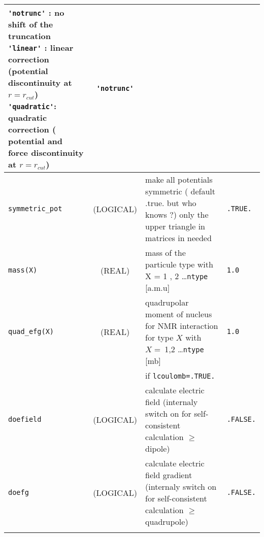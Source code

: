 \documentclass[a4paper,8pt]{article}
\begin{document}
\begin{longtable}{l|c|m{8cm}|m{2cm}}
                                                    \verb?'notrunc'? : no shift of the truncation \newline 
                                                    \verb?'linear'?  : linear correction (potential 
                                                                       discontinuity at $r=r_{cut}$) \newline 
                   			            \verb?'quadratic'?: quadratic correction ( potential and force 
                                                    discontinuity at $r=r_{cut}$) \newline                                  & \verb?'notrunc'? \tabularnewline
\hline
\rule[-0.75cm]{0cm}{1.5cm}
\verb?symmetric_pot?         
                 & (LOGICAL)          &  make all potentials symmetric ( default .true. but who knows ?) \newline  
	                                   only the upper triangle in matrices in needed                                    & \verb?.TRUE.? \tabularnewline
\hline
\rule[-0.75cm]{0cm}{1.5cm}
\verb?mass(X)?   &  (REAL)            & mass of the particule type with X = 1 , 2 \ldots \verb?ntype? [a.m.u]               & \verb?1.0? \\
\hline
\rule[-0.75cm]{0cm}{1.5cm}
\verb?quad_efg(X)? 
                 &  (REAL)            & quadrupolar moment of nucleus for NMR interaction for type $X$ with $X=~$1,2 \ldots \verb?ntype? [mb]     
                                                                                                                            & \verb?1.0? \\
\hline
\rule[-0.75cm]{0cm}{1.5cm}
                 &                    & if \verb?lcoulomb=.TRUE.? & \\
\hline
\rule[-0.75cm]{0cm}{1.5cm}
\verb?doefield?         
                 & (LOGICAL)          &  calculate electric field (internaly switch on for self-consistent calculation  $\ge$ dipole) 
                                                                                                                            & \verb?.FALSE.? \\
\hline
\rule[-0.75cm]{0cm}{1.5cm}
\verb?doefg?         
                 & (LOGICAL)          &  calculate electric field gradient (internaly switch on for self-consistent calculation $\ge$ quadrupole)     
                                                                                                                            & \verb?.FALSE.? \\
\hline
\rule[-0.75cm]{0cm}{1.5cm}

\end{longtable}
\end{document}
